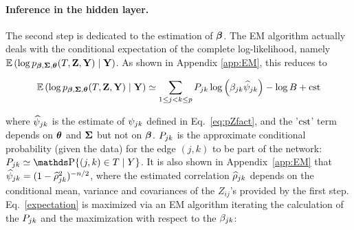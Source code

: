 \paragraph{Inference in the hidden layer.} The second step is dedicated to the estimation of ${\boldsymbol{\beta}}$. The EM algorithm actually deals with the conditional expectation of the complete log-likelihood, namely $\operatorname*{\mathbb{E}}\left(\log p_{{\boldsymbol{\beta}}, {\boldsymbol{\Sigma}}, {\boldsymbol{\theta}}}(T, {\bf Z}, {\bf Y}) \; | \; {\bf Y}\right)$. 
As shown in Appendix \ref{app:EM}, this  reduces to
\begin{linenomath*}
\begin{equation} \label{expectation}
    \operatorname*{\mathbb{E}}\left(\log p_{{\boldsymbol{\beta}}, {\boldsymbol{\Sigma}}, {\boldsymbol{\theta}}}(T, {\bf Z}, {\bf Y}) \; | \; {\bf Y}\right)
    \simeq
    \sum_{1 \leq j < k \leq p} P_{jk} \log \left(\beta_{jk} \widehat{\psi}_{jk}\right) - \log B + \text{cst}
\end{equation}
\end{linenomath*}
where $\widehat{\psi}_{jk}$ is the estimate of $\psi_{jk}$ defined in Eq.~\eqref{eq:pZfact}, and the '$\text{cst}$' term depends on ${\boldsymbol{\theta}}$ and ${\boldsymbol{\Sigma}}$ but not on ${\boldsymbol{\beta}}$. 
$P_{jk}$ is the approximate conditional probability (given the data) for the edge $(j, k)$ to be part of the network:
$P_\jk \simeq \prob\{(j, k) \in T \; | \; Y\}$.
It is also shown in Appendix~\ref{app:EM} that $\widehat{\psi}_{jk} = (1-\widehat{\rho}_{jk}^2)^{-n/2}$, where the estimated correlation $\widehat{\rho}_{jk}$ depends on the conditional mean, variance and covariances of the $Z_{ij}$'s provided by the first step.
 Eq.~\eqref{expectation} is maximized via an EM algorithm iterating the calculation of the $P_{jk}$ and the maximization with respect to the $\beta_{jk}$:

